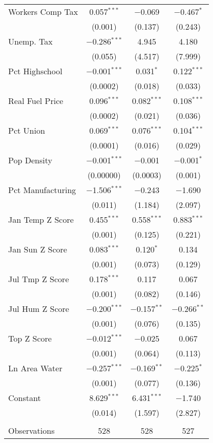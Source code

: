 \begin{table}[!htbp]
\begin{tabular}{@{\extracolsep{5pt}}lccc}
  Workers Comp Tax & 0.057$^{***}$ & $-$0.069 & $-$0.467$^{*}$ \\ 
  & (0.001) & (0.137) & (0.243) \\ 
  Unemp. Tax & $-$0.286$^{***}$ & 4.945 & 4.180 \\ 
  & (0.055) & (4.517) & (7.999) \\ 
  Pct Highschool & $-$0.001$^{***}$ & 0.031$^{*}$ & 0.122$^{***}$ \\ 
  & (0.0002) & (0.018) & (0.033) \\ 
  Real Fuel Price & 0.096$^{***}$ & 0.082$^{***}$ & 0.108$^{***}$ \\ 
  & (0.0002) & (0.021) & (0.036) \\ 
  Pct Union & 0.069$^{***}$ & 0.076$^{***}$ & 0.104$^{***}$ \\ 
  & (0.0001) & (0.016) & (0.029) \\ 
  Pop Density & $-$0.001$^{***}$ & $-$0.001 & $-$0.001$^{*}$ \\ 
  & (0.00000) & (0.0003) & (0.001) \\ 
  Pct Manufacturing & $-$1.506$^{***}$ & $-$0.243 & $-$1.690 \\ 
  & (0.011) & (1.184) & (2.097) \\ 
  Jan Temp Z Score & 0.455$^{***}$ & 0.558$^{***}$ & 0.883$^{***}$ \\ 
  & (0.001) & (0.125) & (0.221) \\ 
  Jan Sun Z Score & 0.083$^{***}$ & 0.120$^{*}$ & 0.134 \\ 
  & (0.001) & (0.073) & (0.129) \\ 
  Jul Tmp Z Score & 0.178$^{***}$ & 0.117 & 0.067 \\ 
  & (0.001) & (0.082) & (0.146) \\ 
  Jul Hum Z Score & $-$0.200$^{***}$ & $-$0.157$^{**}$ & $-$0.266$^{**}$ \\ 
  & (0.001) & (0.076) & (0.135) \\ 
  Top Z Score & $-$0.012$^{***}$ & $-$0.025 & 0.067 \\ 
  & (0.001) & (0.064) & (0.113) \\ 
  Ln Area Water & $-$0.257$^{***}$ & $-$0.169$^{**}$ & $-$0.225$^{*}$ \\ 
  & (0.001) & (0.077) & (0.136) \\ 
  Constant & 8.629$^{***}$ & 6.431$^{***}$ & $-$1.740 \\ 
  & (0.014) & (1.597) & (2.827) \\ 
 \hline \\[-1.8ex] 
Observations & 528 & 528 & 527 \\ 

\end{tabular}
\end{table}
